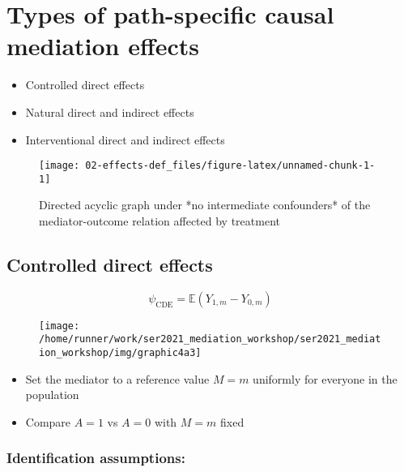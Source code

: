 \documentclass[
  12pt,
]{book}
\providecommand{\tightlist}{%
  \setlength{\itemsep}{0pt}\setlength{\parskip}{0pt}}
\theoremstyle{definition}
\theoremstyle{definition}
\theoremstyle{definition}
\newcommand{\E}{\mathbb{E}}
\newcommand{\1}{\mathbbm{1}}
\begin{document}
\hypertarget{estimands}{%
\chapter{Types of path-specific causal mediation effects}\label{estimands}}

\begin{itemize}
\tightlist
\item
  Controlled direct effects
\item
  Natural direct and indirect effects
\item
  Interventional direct and indirect effects
\end{itemize}

\begin{figure}

{\centering \texttt{[image: 02-effects-def\_files/figure-latex/unnamed-chunk-1-1]} 

}

\caption{Directed acyclic graph under *no intermediate confounders* of the mediator-outcome relation affected by treatment}\label{fig:unnamed-chunk-1}
\end{figure}

\hypertarget{controlled-direct-effects}{%
\section{Controlled direct effects}\label{controlled-direct-effects}}

\[\psi_{\text{CDE}} = \E(Y_{1,m} - Y_{0,m}) \]

\begin{figure}

{\centering \texttt{[image: /home/runner/work/ser2021\_mediation\_workshop/ser2021\_mediation\_workshop/img/graphic4a3]} 

}

\end{figure}

\begin{itemize}
\tightlist
\item
  Set the mediator to a reference value \(M=m\) uniformly for everyone in the
  population
\item
  Compare \(A=1\) vs \(A=0\) with \(M=m\) fixed
\end{itemize}

\hypertarget{identification-assumptions}{%
\subsection{Identification assumptions:}\label{identification-assumptions}}
\end{document}
